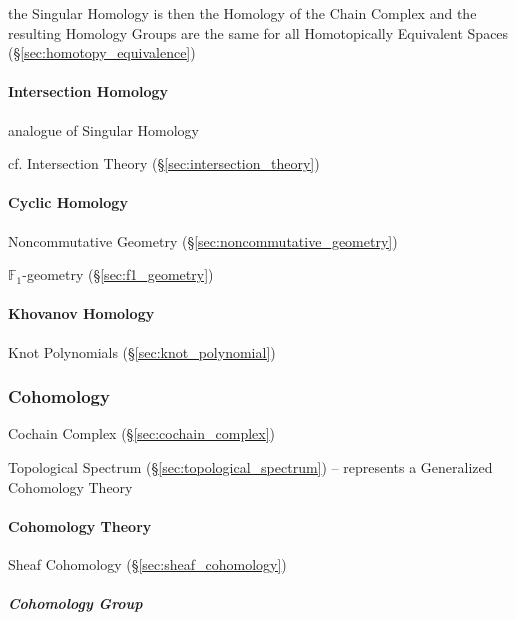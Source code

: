 the Singular Homology is then the Homology of the Chain Complex and the
resulting Homology Groups are the same for all Homotopically Equivalent Spaces
(\S\ref{sec:homotopy_equivalence})



\paragraph{Intersection Homology}\label{sec:intersection_homology}\hfill

analogue of Singular Homology

\fist cf. Intersection Theory (\S\ref{sec:intersection_theory})



\paragraph{Cyclic Homology}\label{sec:cyclic_homology}\hfill

Noncommutative Geometry (\S\ref{sec:noncommutative_geometry})

$\mathbb{F}_1$-geometry (\S\ref{sec:f1_geometry})



\paragraph{Khovanov Homology}\label{sec:khovanov_homology}\hfill

\fist Knot Polynomials (\S\ref{sec:knot_polynomial})



\subsubsection{Cohomology}\label{sec:cohomology}

Cochain Complex (\S\ref{sec:cochain_complex})

Topological Spectrum (\S\ref{sec:topological_spectrum}) --
represents a Generalized Cohomology Theory



\paragraph{Cohomology Theory}\label{sec:cohomology_theory}\hfill

Sheaf Cohomology (\S\ref{sec:sheaf_cohomology})



\subparagraph{Cohomology Group}\label{sec:cohomology_group}\hfill

